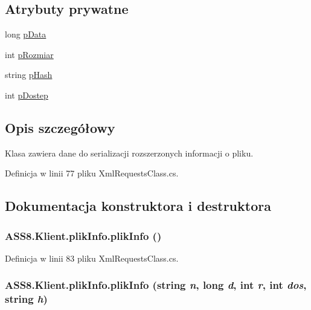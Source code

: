 \subsection*{Atrybuty prywatne}
\begin{CompactItemize}
\item 
long \hyperlink{a00018_c36ffedceffa046ba1bf7e315a6905b8}{pData}
\item 
int \hyperlink{a00018_e808a0115a1a6ff695d46a2605827efc}{pRozmiar}
\item 
string \hyperlink{a00018_340847ed2b521b02d46a77a2dbf71201}{pHash}
\item 
int \hyperlink{a00018_72c17cbc674bf8c89317ac46d02dd758}{pDostep}
\end{CompactItemize}


\subsection{Opis szczegółowy}
Klasa zawiera dane do serializacji rozszerzonych informacji o pliku. 



Definicja w linii 77 pliku XmlRequestsClass.cs.

\subsection{Dokumentacja konstruktora i destruktora}
\hypertarget{a00018_8c70fa9504ce6f44643d48aa6679ff12}{
\subsubsection[{plikInfo}]{\setlength{\rightskip}{0pt plus 5cm}ASS8.Klient.plikInfo.plikInfo ()}}
\label{d1/d2b/a00018_8c70fa9504ce6f44643d48aa6679ff12}




Definicja w linii 83 pliku XmlRequestsClass.cs.\hypertarget{a00018_c7e3bef27e120693a190cf23af55426b}{
\subsubsection[{plikInfo}]{\setlength{\rightskip}{0pt plus 5cm}ASS8.Klient.plikInfo.plikInfo (string {\em n}, \/  long {\em d}, \/  int {\em r}, \/  int {\em dos}, \/  string {\em h})}}
\label{d1/d2b/a00018_c7e3bef27e120693a190cf23af55426b}




